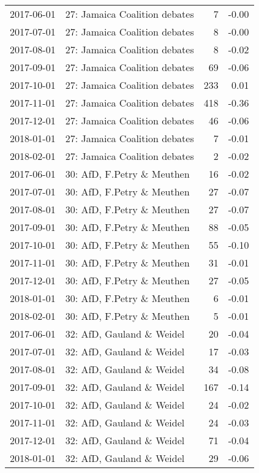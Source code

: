 \begin{adjustbox}{width=\textwidth}
\begin{tabular}{llrr}
  2017-06-01 & 27: Jamaica Coalition debates &   7 & -0.00 \\ 
  2017-07-01 & 27: Jamaica Coalition debates &   8 & -0.00 \\ 
  2017-08-01 & 27: Jamaica Coalition debates &   8 & -0.02 \\ 
  2017-09-01 & 27: Jamaica Coalition debates &  69 & -0.06 \\ 
  2017-10-01 & 27: Jamaica Coalition debates & 233 & 0.01 \\ 
  2017-11-01 & 27: Jamaica Coalition debates & 418 & -0.36 \\ 
  2017-12-01 & 27: Jamaica Coalition debates &  46 & -0.06 \\ 
  2018-01-01 & 27: Jamaica Coalition debates &   7 & -0.01 \\ 
  2018-02-01 & 27: Jamaica Coalition debates &   2 & -0.02 \\ 
  2017-06-01 & 30: AfD, F.Petry \& Meuthen &  16 & -0.02 \\ 
  2017-07-01 & 30: AfD, F.Petry \& Meuthen &  27 & -0.07 \\ 
  2017-08-01 & 30: AfD, F.Petry \& Meuthen &  27 & -0.07 \\ 
  2017-09-01 & 30: AfD, F.Petry \& Meuthen &  88 & -0.05 \\ 
  2017-10-01 & 30: AfD, F.Petry \& Meuthen &  55 & -0.10 \\ 
  2017-11-01 & 30: AfD, F.Petry \& Meuthen &  31 & -0.01 \\ 
  2017-12-01 & 30: AfD, F.Petry \& Meuthen &  27 & -0.05 \\ 
  2018-01-01 & 30: AfD, F.Petry \& Meuthen &   6 & -0.01 \\ 
  2018-02-01 & 30: AfD, F.Petry \& Meuthen &   5 & -0.01 \\ 
  2017-06-01 & 32: AfD, Gauland \& Weidel &  20 & -0.04 \\ 
  2017-07-01 & 32: AfD, Gauland \& Weidel &  17 & -0.03 \\ 
  2017-08-01 & 32: AfD, Gauland \& Weidel &  34 & -0.08 \\ 
  2017-09-01 & 32: AfD, Gauland \& Weidel & 167 & -0.14 \\ 
  2017-10-01 & 32: AfD, Gauland \& Weidel &  24 & -0.02 \\ 
  2017-11-01 & 32: AfD, Gauland \& Weidel &  24 & -0.03 \\ 
  2017-12-01 & 32: AfD, Gauland \& Weidel &  71 & -0.04 \\ 
  2018-01-01 & 32: AfD, Gauland \& Weidel &  29 & -0.06 \\ 

\end{tabular}
\end{adjustbox}
